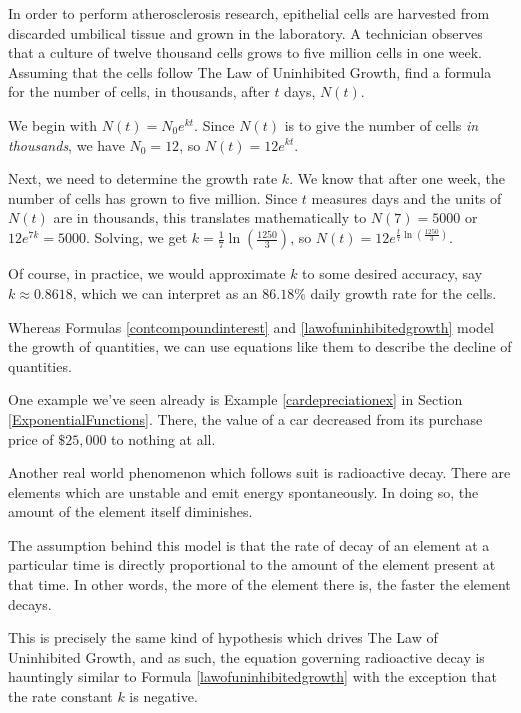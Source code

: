 \documentclass{ximera}
\begin{document}
\begin{example}  In order to perform atherosclerosis research, epithelial cells are harvested from discarded umbilical tissue and grown in the laboratory.  A technician observes that a culture of twelve thousand cells grows to five million cells in one week.  Assuming that the cells follow The Law of Uninhibited Growth, find a formula for the number of cells, in thousands, after $t$ days, $N(t)$.

 

\begin{explanation} We begin with $N(t) = N_0e^{kt}$.  Since $N(t)$ is to give the number of cells \textit{in thousands}, we have $N_0 = 12$, so $N(t) = 12e^{kt}$. 

Next, we need to determine the growth rate $k$.  We know that after one week, the number of cells has grown to five million.  Since $t$ measures days and the units of $N(t)$ are in thousands, this translates mathematically to $N(7) = 5000$ or  $12e^{7k} = 5000$.   Solving, we get $k = \frac{1}{7} \ln\left(\frac{1250}{3}\right)$, so  $N(t) = 12e^{ \frac{t}{7} \ln\left(\frac{1250}{3}\right)}$.  

Of course, in practice, we would approximate $k$ to some desired accuracy, say $k \approx 0.8618$, which we can interpret as an $86.18 \%$ daily growth rate for the cells. 

\end{explanation}
\end{example}

Whereas Formulas \ref{contcompoundinterest} and \ref{lawofuninhibitedgrowth} model the growth of quantities, we can use equations like them to describe the decline of quantities.  


One example we've seen already is Example \ref{cardepreciationex} in Section \ref{ExponentialFunctions}.  There, the value of a car decreased from its purchase price of $\$25,\!000$ to nothing at all.  


Another real world phenomenon which follows suit is radioactive decay.  There are elements which are unstable and emit energy spontaneously.  In doing so, the amount of the element itself diminishes.  

The assumption behind this model is that the rate of decay of an element at a particular time is directly proportional to the amount of the element present at that time.  In other words, the more of the element there is, the faster the element decays.  

This is precisely the same kind of hypothesis which drives The Law of Uninhibited Growth, and as such, the equation governing radioactive decay is hauntingly similar to Formula \ref{lawofuninhibitedgrowth} with the exception that the rate constant $k$ is negative.
\end{document}
